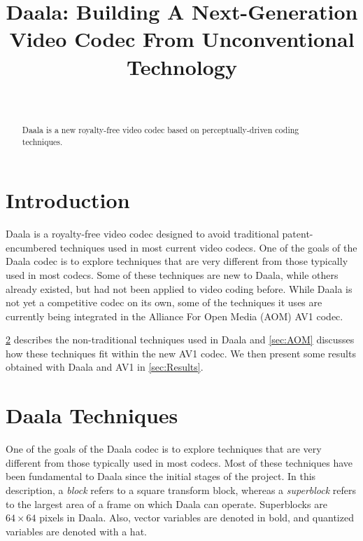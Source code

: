 \documentclass[english,conference,10pt]{IEEEtran}
\begin{document}
\title{Daala: Building A Next-Generation Video Codec From Unconventional
Technology}


\author{\author{
\\
}}
\maketitle
\begin{abstract}
Daala is a new royalty-free video codec based on perceptually-driven
coding techniques.
\end{abstract}


\section{Introduction}

Daala is a royalty-free video codec designed to avoid traditional
patent-encumbered techniques used in most current video codecs. One
of the goals of the Daala codec is to explore techniques that are
very different from those typically used in most codecs. Some of
these techniques are new to Daala, while others already existed, but
had not been applied to video coding before. While Daala is not yet
a competitive codec on its own, some of the techniques it uses are
currently being integrated in the Alliance For Open Media (AOM) AV1 codec.

\cref{sec:techniques} describes the non-traditional techniques used
in Daala and \cref{sec:AOM} discusses how these techniques fit within
the new AV1 codec. We then present some results obtained with Daala and AV1
in \cref{sec:Results}.

\section{Daala Techniques}
\label{sec:techniques}

One of the goals of the Daala codec is to explore techniques that
are very different from those typically used in most codecs. Most
of these techniques have been fundamental to Daala since the initial
stages of the project. In this description, a \textit{block} refers to
a square transform block, whereas a \textit{superblock} refers to the
largest area of a frame on which Daala can operate. Superblocks are $64\times 64$
pixels in Daala. Also, vector variables are denoted in bold, and quantized
variables are denoted with a hat.
\end{document}
